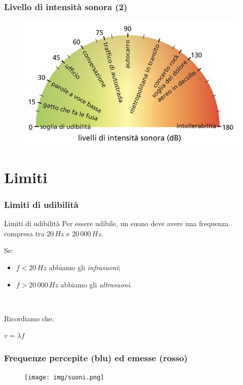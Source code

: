 \documentclass[]{beamer}
\theoremstyle{plain}
\begin{document}
\begin{frame}
\frametitle{Livello di intensità sonora (2)}
\begin{figure}
\includegraphics[width=.7\columnwidth]{img/volume.png}
\end{figure}
\end{frame}





\section{Limiti}

\begin{frame}
\frametitle{Limiti di udibilità}
\begin{block}{Limiti di udibilità}
Per essere udibile, un suono deve avere una frequenza compresa tra $ 20 \, Hz $ e $ 20 \, 000 \, Hz $.
\end{block}
Se:\begin{itemize}
  \item $ f < 20 \, Hz $ abbiamo gli \emph{infrasuoni}; 
  \item $ f > 20\, 000 \, Hz $ abbiamo gli \emph{ultrasuoni}.
\end{itemize}\pause

~

Ricordiamo che:
\begin{center}
$ v = \lambda f $
\end{center}
\end{frame}


\begin{frame}
\frametitle{Frequenze percepite (blu) ed emesse (rosso)}
\begin{figure}
\texttt{[image: img/suoni.png]}
\end{figure}
\end{frame}
\end{document}
